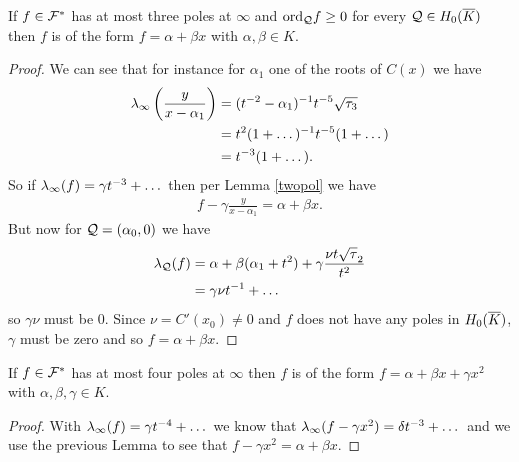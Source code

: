 \documentclass[english,11pt,a4paper]{article}
\begin{document}
\begin{lemma}
	If $f \in \mathcal{F}^*$ has at most three poles at $\infty$ and $\text{ord}_{\mathcal{Q}} f \geq 0$ for every $\mathcal{Q} \in H_0(\overline K)$ then $f$ is of the form $f = \alpha + \beta x$ with $\alpha, \beta \in K$.
	\begin{proof}
		We can see that for instance for $\alpha_1$ one of the roots of $C(x)$ we have
		\begin{align*}
			\lambda_{\infty} \left(\frac{y}{x-\alpha_1}\right) &= (t^{-2} - \alpha_1)^{-1} t^{-5} \sqrt{\tau_3}\\
			&= t^2 (1 + \dots)^{-1} t^{-5}(1 + \dots)\\
			&= t^{-3} (1 + \dots).
		\end{align*}
		So if $\lambda_{\infty} (f) = \gamma t^{-3} + \dots$ then per Lemma \ref{twopol} we have
		\begin{align*}
			f - \gamma \frac{y}{x-\alpha_1} = \alpha + \beta x.
		\end{align*}
		But now for $\mathcal{Q} = (\alpha_0, 0)$ we have
		\begin{align*}
		  \lambda_{\mathcal{Q}} (f) &= \alpha + \beta (\alpha_1 + t^2) + \gamma \frac{\nu t \sqrt \tau_2}{t^{2}}\\
		  &= \gamma \nu t^{-1} + \dots
		\end{align*}
		so $\gamma \nu$ must be 0. Since $\nu = C'(x_0) \neq 0$ and $f$ does not have any poles in $H_0(\overline K)$, $\gamma$ must be zero and so $f = \alpha + \beta x$.


	\end{proof}
\end{lemma}

\begin{lemma}
	If $f \in \mathcal{F}^*$ has at most four poles at $\infty$ then $f$ is of the form $f = \alpha + \beta x + \gamma x^2$ with $\alpha, \beta, \gamma \in K$.
	\begin{proof}
	  With $\lambda_{\infty} (f) = \gamma t^{-4} + \dots$ we know that $\lambda_{\infty} (f - \gamma x^2) = \delta t^{-3} + \dots$ and we use the previous Lemma to see that $f - \gamma x^2 = \alpha + \beta x$.
	\end{proof}
\end{lemma}
\end{document}
